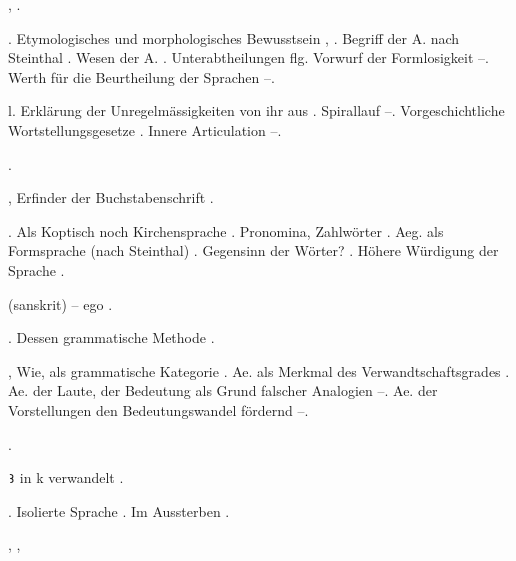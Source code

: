 \begin{register}
 \pageref{sp.160}, \pageref{sp.282}.

. Etymologisches und morphologisches Bewusstsein \pageref{sp.124}, \pageref{sp.384}. Begriff der A. nach Steinthal \pageref{sp.337}. Wesen der A. \pageref{sp.345}. Unterabtheilungen \pageref{sp.349} flg. Vorwurf der Formlosigkeit \pageref{sp.396}–\pageref{sp.397}. Werth für die Beurtheilung der Sprachen \pageref{sp.403}–\pageref{sp.404}.


 l\pageref{sp.80}. Erklärung der Unregelmässigkeiten von ihr aus \pageref{sp.211}. Spirallauf \pageref{sp.255}–\pageref{sp.258}. Vorgeschichtliche Wortstellungsgesetze \pageref{sp.365}. Innere Articulation \pageref{sp.434}–\pageref{sp.436}.

 \pageref{sp.122}\sed{, \pageref{sp.349}}.

, Erfinder der Buchstabenschrift \pageref{sp.19}.

 \pageref{sp.142}. Als Koptisch noch Kirchensprache \pageref{sp.146}. Pronomina, Zahlwörter \pageref{sp.161}. Aeg. als Formsprache (nach Steinthal) \pageref{sp.336}.  Gegensinn der Wörter? \pageref{sp.380}. Höhere Würdigung der Sprache \pageref{sp.389}.

 (sanskrit) – ego \pageref{sp.214}.

. Dessen grammatische Methode \pageref{sp.110}.

, Wie, als grammatische Kategorie \pageref{sp.104}. Ae. als Merkmal des Verwandtschaftsgrades  \pageref{sp.159}. Ae. der Laute, der Bedeutung als Grund falscher Analogien \pageref{sp.211}–\pageref{sp.212}. Ae. der Vorstellungen den Bedeutungswandel fördernd \pageref{sp.232}–\pageref{sp.234}.

 \pageref{sp.149}\sed{, \pageref{sp.251}, \pageref{sp.426}}.

\texttt{Ꜣ} in k verwandelt \pageref{sp.314}.

. Isolierte Sprache \pageref{sp.147}. Im Aussterben \pageref{sp.261}. 


, \pageref{sp.149}, 


\end{register}
